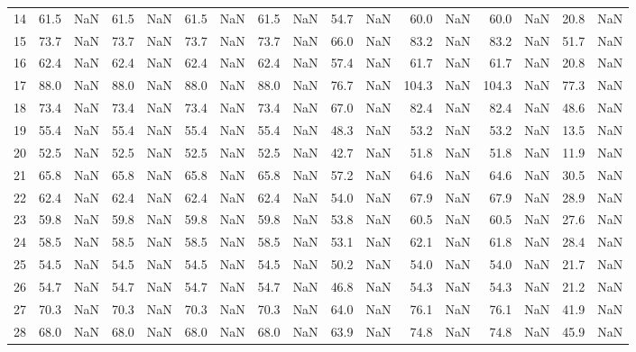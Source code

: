 \begin{tabular}{lrrrrrrrrrrrrrrrr}
     14 & 61.5 & NaN &  61.5 &   NaN &  61.5 &   NaN &  61.5 &   NaN &  54.7 &   NaN &  60.0 &   NaN &  60.0 &   NaN &  20.8 &   NaN \\
     15 & 73.7 & NaN &  73.7 &   NaN &  73.7 &   NaN &  73.7 &   NaN &  66.0 &   NaN &  83.2 &   NaN &  83.2 &   NaN &  51.7 &   NaN \\
     16 & 62.4 & NaN &  62.4 &   NaN &  62.4 &   NaN &  62.4 &   NaN &  57.4 &   NaN &  61.7 &   NaN &  61.7 &   NaN &  20.8 &   NaN \\
     17 & 88.0 & NaN &  88.0 &   NaN &  88.0 &   NaN &  88.0 &   NaN &  76.7 &   NaN & 104.3 &   NaN & 104.3 &   NaN &  77.3 &   NaN \\
     18 & 73.4 & NaN &  73.4 &   NaN &  73.4 &   NaN &  73.4 &   NaN &  67.0 &   NaN &  82.4 &   NaN &  82.4 &   NaN &  48.6 &   NaN \\
     19 & 55.4 & NaN &  55.4 &   NaN &  55.4 &   NaN &  55.4 &   NaN &  48.3 &   NaN &  53.2 &   NaN &  53.2 &   NaN &  13.5 &   NaN \\
     20 & 52.5 & NaN &  52.5 &   NaN &  52.5 &   NaN &  52.5 &   NaN &  42.7 &   NaN &  51.8 &   NaN &  51.8 &   NaN &  11.9 &   NaN \\
     21 & 65.8 & NaN &  65.8 &   NaN &  65.8 &   NaN &  65.8 &   NaN &  57.2 &   NaN &  64.6 &   NaN &  64.6 &   NaN &  30.5 &   NaN \\
     22 & 62.4 & NaN &  62.4 &   NaN &  62.4 &   NaN &  62.4 &   NaN &  54.0 &   NaN &  67.9 &   NaN &  67.9 &   NaN &  28.9 &   NaN \\
     23 & 59.8 & NaN &  59.8 &   NaN &  59.8 &   NaN &  59.8 &   NaN &  53.8 &   NaN &  60.5 &   NaN &  60.5 &   NaN &  27.6 &   NaN \\
     24 & 58.5 & NaN &  58.5 &   NaN &  58.5 &   NaN &  58.5 &   NaN &  53.1 &   NaN &  62.1 &   NaN &  61.8 &   NaN &  28.4 &   NaN \\
     25 & 54.5 & NaN &  54.5 &   NaN &  54.5 &   NaN &  54.5 &   NaN &  50.2 &   NaN &  54.0 &   NaN &  54.0 &   NaN &  21.7 &   NaN \\
     26 & 54.7 & NaN &  54.7 &   NaN &  54.7 &   NaN &  54.7 &   NaN &  46.8 &   NaN &  54.3 &   NaN &  54.3 &   NaN &  21.2 &   NaN \\
     27 & 70.3 & NaN &  70.3 &   NaN &  70.3 &   NaN &  70.3 &   NaN &  64.0 &   NaN &  76.1 &   NaN &  76.1 &   NaN &  41.9 &   NaN \\
     28 & 68.0 & NaN &  68.0 &   NaN &  68.0 &   NaN &  68.0 &   NaN &  63.9 &   NaN &  74.8 &   NaN &  74.8 &   NaN &  45.9 &   NaN \\

\end{tabular}
